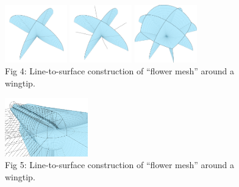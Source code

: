 \documentclass[landscape]{sintefposter}
\begin{document}
\begin{multicols}{3}
\begin{tcolorbox}[colback=white,colframe=sintefblue,title=Wingtip meshing]
\begin{figure}[ht]
\begin{center}
      \includegraphics[width=0.24\textwidth]{Figures/wingtip-first}
      \includegraphics[width=0.24\textwidth]{Figures/wingtip-centers}
      \includegraphics[width=0.24\textwidth]{Figures/wingtip-flower} \\
      \normalsize{
        Fig 4: Line-to-surface construction of ``flower mesh'' around a wingtip.
      }
    \end{center}
  \end{figure}
\end{tcolorbox}
\begin{tcolorbox}[colback=white,colframe=sintefblue,title=Windturbine blade]
  \begin{figure}[ht]
    \begin{center}
      \includegraphics[width=0.32\textwidth]{Figures/block-2} \\
      \normalsize{
        Fig 5: Line-to-surface construction of ``flower mesh'' around a wingtip.
      }
    \end{center}
  \end{figure}
\end{tcolorbox}


\end{multicols}
\end{document}
